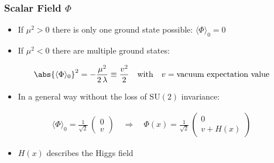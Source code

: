 \documentclass[xcolor={usenames,dvipsnames,svgnames,table}]{beamer}
\newcommand{\av}[1]{\ensuremath{\langle #1 \rangle}\xspace}
\begin{document}
\begin{frame}
    \frametitle{Scalar Field $\Phi$}
    \begin{itemize}
        \item If $\mu^2>0$ there is only one ground state possible: $\av{\Phi}_0=0$
        \item If $\mu^2<0$ there are multiple ground states:
    \end{itemize}
    \begin{gather*}
        \abs{\av{\Phi}_0}^2 = -\frac{\mu^2}{2 \, \lambda} \equiv \frac{v^2}{2} \quad \text{with} \quad v=\text{vacuum expectation value}
    \end{gather*}
    \begin{itemize}
        \item In a general way without the loss of $\mathrm{SU}(2)$ invariance:
    \end{itemize}
    \begin{gather*}
        \av{\Phi}_0 = \frac{1}{\sqrt 2} \, \begin{pmatrix} 0 \\ v \end{pmatrix} \quad \Rightarrow \quad \Phi(x) = \frac{1}{\sqrt 2} \, \begin{pmatrix} 0 \\ v + H(x) \end{pmatrix}
    \end{gather*}
    \begin{itemize}
        \item $H(x)$ describes the Higgs field
    \end{itemize}
\end{frame}
\end{document}
